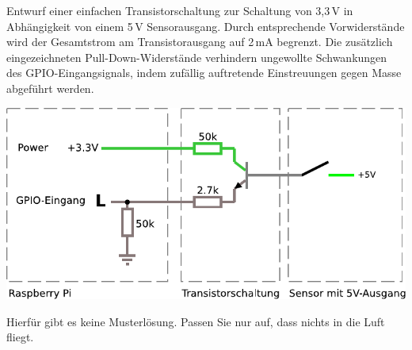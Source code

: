 \bigskip
\teilaufgabe
Entwurf einer einfachen Transistorschaltung zur Schaltung von 3,3\,V in
Abhängigkeit von einem 5\,V Sensorausgang. Durch entsprechende Vorwiderstände
wird der Gesamtstrom am Transistorausgang auf 2\,mA begrenzt. Die zusätzlich
eingezeichneten Pull-Down-Widerstände verhindern ungewollte Schwankungen des
GPIO-Eingangsignals, indem zufällig auftretende Einstreuungen gegen Masse
abgeführt werden.

\includegraphics[width=\textwidth]{img/logiklevel_transistor_aufgabe}








Hierfür gibt es keine Musterlösung. Passen Sie nur auf, dass nichts in die
Luft fliegt. \smiley
